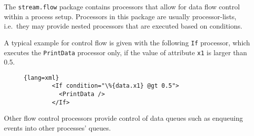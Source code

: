 The \texttt{stream.flow} package contains processors that allow for data
flow control within a process setup. Processors in this package are
usually processor-lists, i.e.~they may provide nested processors that
are executed based on conditions.

A typical example for control flow is given with the following
\texttt{If} processor, which executes the \texttt{PrintData} processor
only, if the value of attribute \texttt{x1} is larger than 0.5.
\begin{figure}[h!]
  \begin{lstlisting}{lang=xml}
        <If condition="\%{data.x1} @gt 0.5">
          <PrintData />
        </If>
  \end{lstlisting}
\end{figure}
Other flow control processors provide control of data queues such as
enqueuing events into other processes' queues.


%
%







